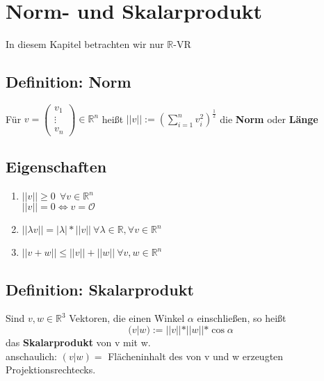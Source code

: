  


\section{Norm- und Skalarprodukt}
In diesem Kapitel betrachten wir nur $\mathbb{R}$-VR

\subsection{Definition: Norm}
Für $v=\begin{pmatrix}v_1 \\ \vdots \\ v_n\end{pmatrix}\in\mathbb{R}^n$ heißt $||v|| := (\sum_{i=1}^n v_i^2)^{\frac{1}{2}}$ die \textbf{Norm} oder \textbf{Länge}

\subsection{Eigenschaften}
\begin{enumerate}
	\item
	$||v|| \ge 0 \ \ \forall v\in\mathbb{R}^n$\\
	$||v|| = 0 \Leftrightarrow v=\mathcal{O}$
	
	\item
	$||\lambda v||=|\lambda|*||v|| \ \forall \lambda \in \mathbb{R}, \forall v\in\mathbb{R}^n$
	
	\item
	$||v+w|| \le ||v||+||w|| \ \forall v,w \in \mathbb{R}^n$
\end{enumerate}

\subsection{Definition: Skalarprodukt}
Sind $v,w \in \mathbb{R}^3$ Vektoren, die einen Winkel $\alpha$ einschließen, so heißt \[(v|w) := ||v||*||w||*\cos \alpha\] das \textbf{Skalarprodukt} von v mit w.\\
anschaulich: $(v|w)=$ Flächeninhalt des von v und w erzeugten Projektionsrechtecks.

